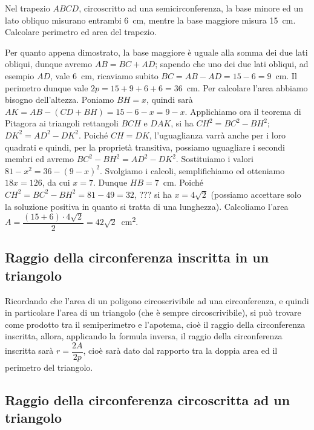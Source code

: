 \begin{exrig}
\begin{esempio}
Nel trapezio $ABCD$, circoscritto ad una semicirconferenza, la base minore ed un lato obliquo misurano entrambi 6~cm, mentre la base maggiore misura 15~cm. Calcolare perimetro ed area del trapezio.\vspace{7pt}

Per quanto appena dimostrato, la base maggiore è uguale alla somma dei due lati obliqui, dunque avremo $AB=BC+AD$; sapendo che uno dei due lati obliqui, ad esempio $AD$, vale 6~cm, ricaviamo  subito $BC=AB-AD=15-6=9$~cm.
Il perimetro dunque vale $2p = 15 + 9 + 6 + 6 = 36$~cm.
Per calcolare l'area abbiamo bisogno dell'altezza.
Poniamo $BH=x$, quindi sarà $AK=AB-(CD+BH)=15-6-x=9-x$.
Applichiamo ora il teorema di Pitagora ai triangoli rettangoli $BCH$ e $DAK$, si ha $CH^2 = BC^2 - BH^2$; $DK^2 = AD^2 - DK^2$. Poiché $CH=DK$, l'uguaglianza varrà anche per i loro quadrati e quindi, per la proprietà transitiva, possiamo uguagliare i secondi membri ed avremo
$BC^2 - BH^2 = AD^2 - DK^2$. Sostituiamo i valori $81-x^2=36-(9-x)^2$.
Svolgiamo i calcoli, semplifichiamo ed otteniamo $18x=126$, da cui $x=7$. Dunque $HB = 7$~cm.
Poiché $CH^2=BC^2-BH^2=81-49=32$, ??? si ha $x=4\sqrt{2}$  (possiamo accettare solo la soluzione positiva in quanto si tratta di una lunghezza). Calcoliamo l'area $A=\dfrac{(15+6)\cdot 4\sqrt{2}}{2}=42\sqrt{2}$~cm\textsuperscript{2}.
\end{esempio}
\end{exrig}

\subsection{Raggio della circonferenza inscritta in un triangolo}

Ricordando che l'area di un poligono circoscrivibile ad una circonferenza, e quindi in particolare l'area di un triangolo (che è sempre circoscrivibile), si può trovare come prodotto tra il semiperimetro e l'apotema, cioè il raggio della circonferenza inscritta, allora, applicando la formula inversa, il raggio della circonferenza inscritta sarà $r=\dfrac{2A}{2p}$, cioè sarà dato dal rapporto tra la doppia area ed il perimetro del triangolo.


\subsection{Raggio della circonferenza circoscritta ad un triangolo}

